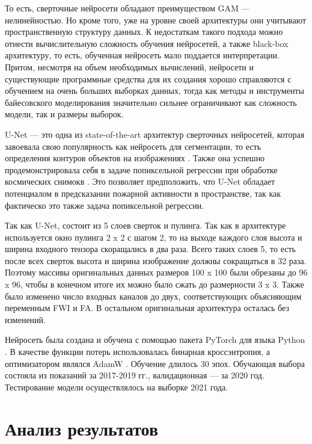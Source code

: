\documentclass[a4paper,article,14pt]{extarticle}
\begin{document}
То есть, сверточные нейросети обладают преимуществом GAM — нелинейностью. Но кроме того, уже на уровне своей архитектуры они учитывают пространственную структуру данных. К недостаткам такого подхода можно отнести вычислительную сложность обучения нейросетей, а также black-box архитектуру, то есть, обученная нейросеть мало поддается интерпретации. Притом, несмотря на объем необходимых вычислений, нейросети и существующие программные средства для их создания хорошо справляются с обучением на очень больших выборках данных, тогда как методы и инструменты байесовского моделирования значительно сильнее ограничивают как сложность модели, так и размеры выборок.

U-Net — это одна из state-of-the-art архитектур сверточных нейросетей, которая завоевала свою популярность как нейросеть для сегментации, то есть определения контуров объектов на изображениях \cite{RonnebergerUNetConvolutionalNetworks2015}. Также она успешно продемонстрировала себя в задаче попиксельной регрессии при обработке космических снимокв \cite{YaoPixelwiseRegressionUsing2018}. Это позволяет предположить, что U-Net обладает потенциалом в предсказании пожарной активности в пространстве, так как фактическо это также задача попиксельной регрессии.

Так как U-Net, состоит из 5 слоев сверток и пулинга. Так как в архитектуре используется окно пулинга 2 x 2 с шагом 2, то на выходе каждого слоя высота и ширина входного тензора скоращались в два раза. Всего таких слоев 5, то есть после всех сверток высота и ширина изображение должны сокращаться в 32 раза. Поэтому массивы оригинальных данных размеров 100 x 100 были обрезаны до 96 x 96, чтобы в конечном итоге их можно было сжать до размерности 3 x 3. Также было изменено число входных каналов до двух, соответствующих объясняющим переменным FWI и FA. В остальном оригинальная архитектура осталась без изменений.

Нейросеть была создана и обучена с помощью пакета PyTorch для языка Python \cite{PaszkeAutomaticDifferentiationPyTorch2017}. В качестве функции потерь использовалась бинарная кроссэнтропия, а оптимизатором являлся AdamW \cite{LoshchilovDecoupledWeightDecay2019}. Обучение длилось 30 эпох. Обучающая выбора состояла из показаний за 2017-2019 гг., валидационная — за 2020 год. Тестирование модели осуществлялось на выборке 2021 года.

\pagebreak
\section{Анализ результатов}
\end{document}

